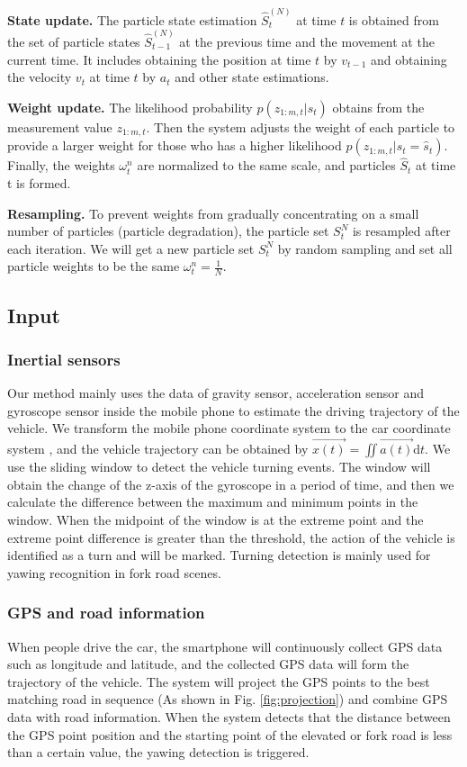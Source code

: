 \documentclass[journal]{IEEEtran}
\begin{document}
\textbf{State update.} 
The particle state estimation $\hat{S}_{t}^{(N)}$ at time $t$ is obtained from the set of particle states $\hat{S}_{t-1}^{(N)}$ at the previous time and the movement at the current time. It includes obtaining the position at time $t$ by $v_{t-1}$ and obtaining the velocity $v_{t}$ at time $t$ by $a_{t}$ and other state estimations.

\textbf{Weight update.}
The likelihood probability $p(z_{1:m,t}|\hat{s}_t)$ obtains from the measurement value $z_{1:m,t}$. Then the system adjusts the weight of each particle to provide a larger weight for those who has a higher likelihood $p(z_{1:m,t}|s_t = \hat{s}_t)$. Finally, the weights $\omega_{t}^{n}$ are normalized to the same scale, and particles $\hat{S}_t$ at time t is formed.

\textbf{Resampling.}
To prevent weights from gradually concentrating on a small number of particles (particle degradation), the particle set $S_{t}^{N}$ is resampled after each iteration. We will get a new particle set $S_{t}^{N}$ by random sampling and set all particle weights to be the same $\omega_{t}^{n} = \frac{1}{N}$.

\subsection{Input}
\subsubsection{Inertial sensors}
Our method mainly uses the data of gravity sensor, acceleration sensor and gyroscope sensor inside the mobile phone to estimate the driving trajectory of the vehicle. We transform the mobile phone coordinate system to the car coordinate system \cite{xiao2021many, gao2017smartphone}, and the vehicle trajectory can be obtained by $\Vec{x(t)}=\iint\Vec{a(t)}\mathrm{d}t$. We use the sliding window to detect the vehicle turning events. The window will obtain the change of the z-axis of the gyroscope in a period of time, and then we calculate the difference between the maximum and minimum points in the window. When the midpoint of the window is at the extreme point and the extreme point difference is greater than the threshold, the action of the vehicle is identified as a turn and will be marked. Turning detection is mainly used for yawing recognition in fork road scenes.

\subsubsection{GPS and road information}
When people drive the car, the smartphone will continuously collect GPS data such as longitude and latitude, and the collected GPS data will form the trajectory of the vehicle. The system will project the GPS points to the best matching road in sequence (As shown in Fig. \ref{fig:projection}) and combine GPS data with road information. When the system detects that the distance between the GPS point position and the starting point of the elevated or fork road is less than a certain value, the yawing detection is triggered.
\end{document}
